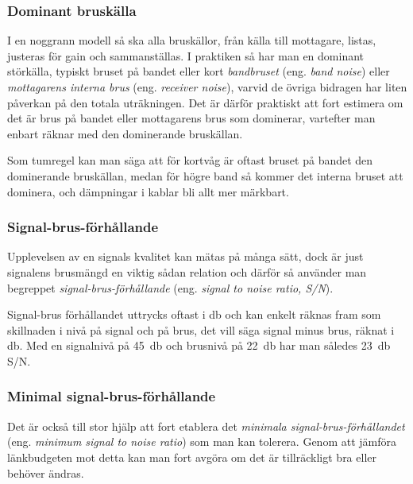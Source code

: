 \subsubsection{Dominant bruskälla}

I en noggrann modell så ska alla bruskällor, från källa till mottagare,
listas, justeras för gain och sammanställas.
I praktiken så har man en dominant störkälla, typiskt bruset på bandet eller
kort \emph{bandbruset} (eng. \emph{band noise}) eller
\emph{mottagarens interna brus} (eng. \emph{receiver noise}),
varvid de övriga bidragen har liten påverkan på den totala uträkningen.
Det är därför praktiskt att fort estimera om det är brus på bandet eller
mottagarens brus som dominerar, vartefter man enbart räknar med den
dominerande bruskällan.

Som tumregel kan man säga att för kortvåg är oftast bruset på bandet
den dominerande bruskällan, medan för högre band så kommer det interna
bruset att dominera, och dämpningar i kablar bli allt mer märkbart.

\subsubsection{Signal-brus-förhållande}

Upplevelsen av en signals kvalitet kan mätas på många sätt, dock är just
signalens brusmängd en viktig sådan relation och därför så använder man
begreppet \emph{signal-brus-förhållande} (eng.
\emph{signal to noise ratio, S/N}).

Signal-brus förhållandet uttrycks oftast i \unit{\decibel} och kan enkelt räknas
fram som skillnaden i nivå på signal och på brus, det vill säga signal minus
brus, räknat i \unit{\decibel}.
Med en signalnivå på \qty{45}{\decibel} och brusnivå på \qty{22}{\decibel} har
man således \qty{+23}{\decibel} S/N.

\subsubsection{Minimal signal-brus-förhållande}

Det är också till stor hjälp att fort etablera det \emph{minimala
signal-brus-förhållandet} (eng. \emph{minimum signal to noise ratio})
som man kan tolerera.
Genom att jämföra länkbudgeten mot detta kan man fort avgöra om det är
tillräckligt bra eller behöver ändras.

